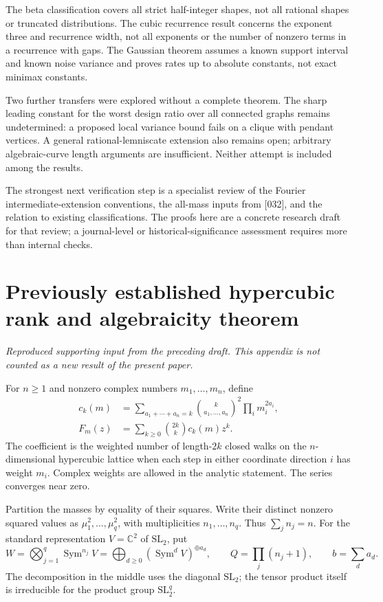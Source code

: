 \documentclass[11pt,a4paper]{article}
\theoremstyle{definition}
\theoremstyle{remark}
\numberwithin{equation}{section}
\newcommand{\collectedappendix}{%
 \setcounter{section}{0}%
 \renewcommand{\thesection}{\Roman{part}.\Alph{section}}%
 \renewcommand{\theHsection}{p\arabic{part}.a\arabic{section}}%
}
\begin{document}
The beta classification covers all strict half-integer shapes, not
all rational shapes or truncated distributions. The cubic recurrence
result concerns the exponent three and recurrence width, not all
exponents or the number of nonzero terms in a recurrence with gaps.
The Gaussian theorem assumes a known support interval and known noise
variance and proves rates up to absolute constants, not exact minimax
constants.

Two further transfers were explored without a complete theorem. The
sharp leading constant for the worst design ratio over all connected
graphs remains undetermined: a proposed local variance bound fails on
a clique with pendant vertices. A general rational-lemniscate extension
also remains open; arbitrary algebraic-curve length arguments are
insufficient. Neither attempt is included among the results.

The strongest next verification step is a specialist review of the
Fourier intermediate-extension conventions, the all-mass inputs from
[032], and the relation to existing classifications. The proofs here
are a concrete research draft for that review; a journal-level or
historical-significance assessment requires more than internal checks.



\clearpage
\collectedappendix

\section{Previously established hypercubic rank and algebraicity theorem}
\label{p6:bg:sec}
\noindent\textit{Reproduced supporting input from the preceding draft. This appendix is not counted as a new result of the present paper.}


For $n\ge1$ and nonzero complex numbers $m_1,\ldots,m_n$, define
\begin{align}
 c_k(m)&=\sum_{a_1+\cdots+a_n=k}
       \binom{k}{a_1,\ldots,a_n}^{\!2}\prod_i m_i^{2a_i},\\
 F_m(z)&=\sum_{k\ge0}\binom{2k}{k}c_k(m)z^k.
 \label{p6:bg:F}
\end{align}
The coefficient is the weighted number of length-$2k$ closed walks
on the $n$-dimensional hypercubic lattice when each step in either
coordinate direction $i$ has weight $m_i$.  Complex weights are
allowed in the analytic statement.  The series converges near zero.

Partition the masses by equality of their squares.  Write their
distinct nonzero squared values as $\mu_1^2,\ldots,\mu_q^2$, with
multiplicities $n_1,\ldots,n_q$.  Thus $\sum_jn_j=n$.  For the
standard representation $V=\mathbb C^2$ of $\mathrm{SL}_2$, put
\begin{equation}\label{p6:bg:W}
 W=\bigotimes_{j=1}^q\operatorname{Sym}^{n_j}V
     =\bigoplus_{d\ge0}(\operatorname{Sym}^dV)^{\oplus a_d},
 \qquad Q=\prod_j(n_j+1),\qquad b=\sum_da_d.
\end{equation}
The decomposition in the middle uses the diagonal $\mathrm{SL}_2$;
the tensor product itself is irreducible for the product group
$\mathrm{SL}_2^q$.
\end{document}
